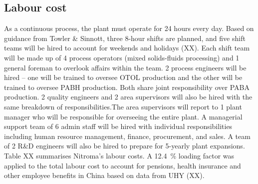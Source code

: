 \subsection{Labour cost}
As a continuous process, the plant must operate for 24 hours every day. Based on guidance from Towler \& Sinnott, three 8-hour shifts are planned, and five shift teams will be hired to account for weekends and holidays (XX). Each shift team will be made up of 4 process operators (mixed solids-fluids processing) and 1 general foreman to overlook affairs within the team. 2 process engineers will be hired – one will be trained to oversee OTOL production and the other will be trained to oversee PABH production. Both share joint responsibility over PABA production. 2 quality engineers and 2 area supervisors will also be hired with the same breakdown of responsibilities.The area supervisors will report to 1 plant manager who will be responsible for overseeing the entire plant. A managerial support team of 6 admin staff will be hired with individual responsibilities including human resource management, finance, procurement, and sales. A team of 2 R\&D engineers will also be hired to prepare for 5-yearly plant expansions.
Table XX summarises Nitroma's labour costs. A \SI{12.4}{\percent} loading factor was applied to the total labour cost to account for pensions, health insurance and other employee benefits in China based on data from UHY (XX).

